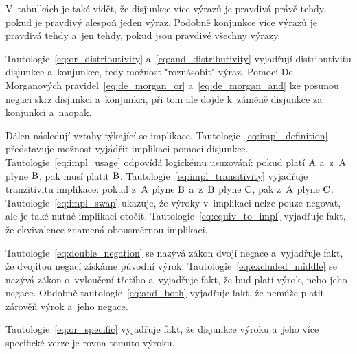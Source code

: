 

V~tabulkách je také vidět, že disjunkce více výrazů je pravdivá právě tehdy, pokud je pravdivý alespoň jeden výraz. Podobně konjunkce více výrazů je pravdivá tehdy a~jen tehdy, pokud jsou pravdivé všechny výrazy.

\begin{fact}
\end{fact}

 Tautologie~\eqref{eq:or_distributivity} a~\eqref{eq:and_distributivity} vyjadřují distributivitu disjunkce a~konjunkce, tedy možnost "roznásobit" výraz. Pomocí De-Morganových pravidel~\eqref{eq:de_morgan_or} a~\eqref{eq:de_morgan_and} lze posunou negaci skrz disjunkci a~konjunkci, při tom ale dojde k~záměně disjunkce za konjunkci a~naopak.

Dálen následují vztahy týkající se implikace. Tautologie~\eqref{eq:impl_definition} představuje možnost vyjádřit implikaci pomocí disjunkce. Tautologie~\eqref{eq:impl_usage} odpovídá logickému usuzování: pokud platí \(\mathrm{A}\) a~z~\(\mathrm{A}\) plyne \(\mathrm{B}\), pak musí platit \(\mathrm{B}\). Tautologie~\eqref{eq:impl_transitivity} vyjadřuje tranzitivitu implikace: pokud z~\(\mathrm{A}\) plyne \(\mathrm{B}\) a~z~\(\mathrm{B}\) plyne \(\mathrm{C}\), pak z~\(\mathrm{A}\) plyne \(\mathrm{C}\). Tautologie~\eqref{eq:impl_swap} ukazuje, že výroky v~implikaci nelze pouze negovat, ale je také nutné implikaci otočit. Tautologie~\eqref{eq:equiv_to_impl} vyjadřuje fakt, že ekvivalence znamená obousměrnou implikaci.

Tautologie~\eqref{eq:double_negation} se nazývá zákon dvojí negace a~vyjadřuje fakt, že dvojitou negací získáme původní výrok. Tautologie~\eqref{eq:excluded_middle} se nazývá zákon o~vyloučení třetího a~vyjadřuje fakt, že buď platí výrok, nebo jeho negace. Obdobně tautologie~\eqref{eq:and_both} vyjadřuje fakt, že nemůže platit zárověň výrok a~jeho negace.

Tautologie~\eqref{eq:or_specific} vyjadřuje fakt, že disjunkce výroku a~jeho více specifické verze je rovna tomuto výroku.

